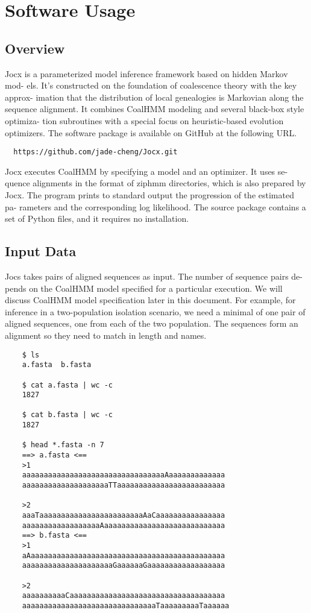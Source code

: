 \section{Software Usage}

\subsection{Overview}

Jocx is a parameterized model inference framework based on hidden Markov mod-
els. It’s constructed on the foundation of coalescence theory with the key
approx- imation that the distribution of local genealogies is Markovian along
the sequence alignment. It combines CoalHMM modeling and several black-box style
optimiza- tion subroutines with a special focus on heuristic-based evolution
optimizers. The software package is available on GitHub at the following URL.

{\small{}\begin{verbatim}
  https://github.com/jade-cheng/Jocx.git
\end{verbatim}}

Jocx executes CoalHMM by specifying a model and an optimizer. It uses se- quence
alignments in the format of ziphmm directories, which is also prepared by Jocx.
The program prints to standard output the progression of the estimated pa-
rameters and the corresponding log likelihood. The source package contains a set
of Python files, and it requires no installation.

\subsection{Input Data}

Jocs takes pairs of aligned sequences as input. The number of sequence pairs de-
pends on the CoalHMM model specified for a particular execution. We will discuss
CoalHMM model specification later in this document. For example, for inference
in a two-population isolation scenario, we need a minimal of one pair of aligned
sequences, one from each of the two population. The sequences form an alignment
so they need to match in length and names.

{\small{}\begin{verbatim}
    $ ls
    a.fasta  b.fasta

    $ cat a.fasta | wc -c
    1827

    $ cat b.fasta | wc -c
    1827

    $ head *.fasta -n 7
    ==> a.fasta <==
    >1
    aaaaaaaaaaaaaaaaaaaaaaaaaaaaaaaaaAaaaaaaaaaaaaa
    aaaaaaaaaaaaaaaaaaaaTTaaaaaaaaaaaaaaaaaaaaaaaaa

    >2
    aaaTaaaaaaaaaaaaaaaaaaaaaaaaAaCaaaaaaaaaaaaaaaa
    aaaaaaaaaaaaaaaaaaAaaaaaaaaaaaaaaaaaaaaaaaaaaaa
    ==> b.fasta <==
    >1
    aAaaaaaaaaaaaaaaaaaaaaaaaaaaaaaaaaaaaaaaaaaaaaa
    aaaaaaaaaaaaaaaaaaaaaGaaaaaaGaaaaaaaaaaaaaaaaaa

    >2
    aaaaaaaaaaCaaaaaaaaaaaaaaaaaaaaaaaaaaaaaaaaaaaa
    aaaaaaaaaaaaaaaaaaaaaaaaaaaaaaaTaaaaaaaaaTaaaaaa
\end{verbatim}}

